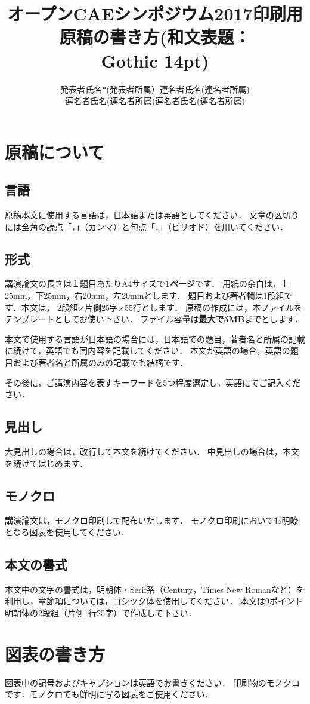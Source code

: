 \documentclass{ltjoc}
\title{オープンCAEシンポジウム2017印刷用原稿の書き方(和文表題：\\Gothic 14pt)}
\author{\begin{tabular}[t]{ccccc}
発表者氏名* & (発表者所属）& & 連名者氏名 & (連名者所属)\\
連名者氏名  & (連名者所属) & & 連名者氏名 & (連名者所属)
\end{tabular}}
\begin{document}
\maketitle
%
\section{原稿について}
\subsection{言語}
原稿本文に使用する言語は，日本語または英語としてください．
文章の区切りには全角の読点「，」（カンマ）と句点「．」（ピリオド）を用いてください． 
\subsection{形式}
講演論文の長さは１題目あたりA4サイズで\textbf{1ページ}です．
用紙の余白は，上25mm，下25mm，右20mm，左20mmとします．
題目および著者欄は1段組です．本文は，
2段組×片側25字×55行とします．
原稿の作成には，本ファイルをテンプレートとしてお使い下さい．
ファイル容量は\textbf{最大で5MB}までとします．

本文で使用する言語が日本語の場合には，日本語での題目，著者名と所属の記載に続けて，英語でも同内容を記載してください．
本文が英語の場合，英語の題目および著者名と所属のみの記載でも結構です．

その後に，ご講演内容を表すキーワードを5つ程度選定し，英語にてご記入ください．
\subsection{見出し}
大見出しの場合は，改行して本文を続けてください．
中見出しの場合は，本文を続けてはじめます．
\subsection{モノクロ}
講演論文は，モノクロ印刷して配布いたします．
モノクロ印刷においても明瞭となる図表を使用してください．
\subsection{本文の書式}
本文中の文字の書式は，明朝体・Serif系（Century，Times New Romanなど）を利用し，章節項については，ゴシック体を使用してください．
本文は9ポイント明朝体の2段組（片側1行25字）で作成して下さい． 
%
\zh
\section{図表の書き方}
図表中の記号およびキャプションは英語でお書きください．
印刷物のモノクロです．モノクロでも鮮明に写る図表をご使用ください．
\end{document}
